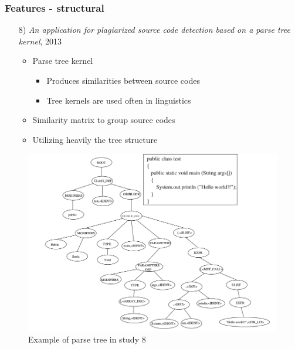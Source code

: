 \documentclass[t,12pt,pdftex]{beamer}
\begin{document}
\begin{frame}
	\frametitle{Features - structural}
	\begin{itemize}
		\item[8)] \textit{An application for plagiarized source code detection based on a parse
tree kernel}, 2013
	\begin{itemize}
		\item Parse tree kernel
		\begin{itemize}
			\item Produces similarities between source codes
			\item Tree kernels are used often in linguistics
		\end{itemize}
		\item Similarity matrix to group source codes 
		\item Utilizing heavily the tree structure
	\end{itemize}
	\end{itemize}
\end{frame}

\begin{frame}
	\begin{figure}[ht]
			\centering
			\includegraphics[scale=0.3]{parse_tree}	
			\caption{Example of parse tree in study 8}
	\end{figure}
\end{frame}
\end{document}
